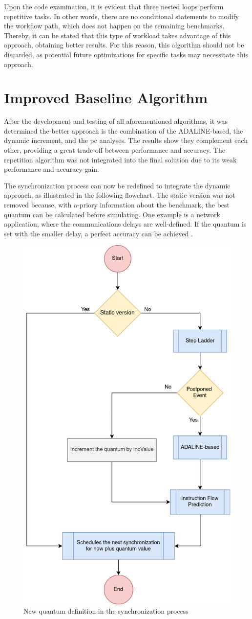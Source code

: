 Upon the code examination, it is evident that three nested loops perform repetitive tasks. In other words, there are no conditional 
statements to modify the workflow path, which does not happen on the remaining benchmarks. Thereby, it can be stated that this type of 
workload takes advantage of this approach, obtaining better results. For this reason, this algorithm should not be discarded, as potential 
future optimizations for specific tasks may necessitate this approach.

\section{Improved Baseline Algorithm}
\label{subsec::finalAlgorithm}

After the development and testing of all aforementioned algorithms, it was determined the better approach is the combination of the ADALINE-based, 
the dynamic increment, and the \gls{pc} analyses. The results show they complement each other, providing a great trade-off between performance 
and accuracy. The repetition algorithm was not integrated into the final solution due to its weak performance and accuracy gain. 

The synchronization process can now be redefined to integrate the dynamic approach, as illustrated in the following flowchart. 
The static version was not removed because, with a-priory information about the benchmark, 
the best quantum can be calculated before simulating. One example is a network application, where the communications delays are well-defined. 
If the quantum is set with the smaller delay, a perfect accuracy can be achieved \cite{dist-gem5}. 

\begin{figure}[H]
	\centering
 	\includegraphics[width=0.48\linewidth]{Images/NewGlobalSyncEventStatic.png}
 	\caption{New quantum definition in the synchronization process}
	\label{fig_NewGlobalSyncEventStatic}
\end{figure}

